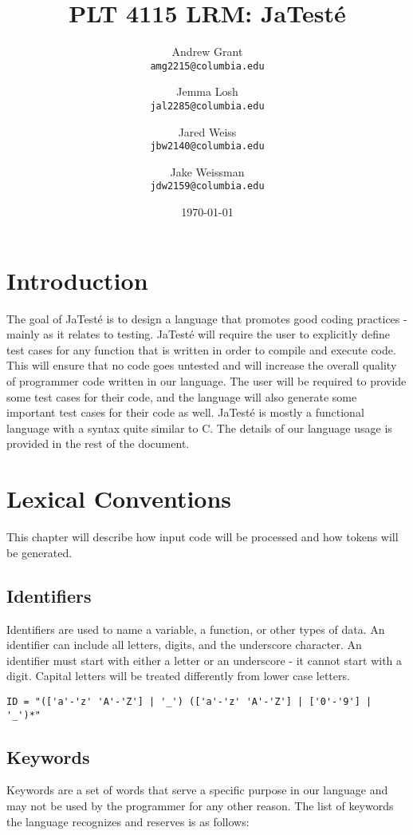 \documentclass{article}
\title{PLT 4115 LRM: \textbf{JaTest\'{e}}}
\author{
	Andrew Grant\\
	\texttt{amg2215@columbia.edu}
	\and
	Jemma Losh\\
	\texttt{jal2285@columbia.edu}
	\and
	Jared Weiss\\
	\texttt{jbw2140@columbia.edu}
	\and
	Jake Weissman\\
	\texttt{jdw2159@columbia.edu}
}
\date{\today}
\begin{document}
\maketitle
\newpage

\tableofcontents
\newpage

\section{Introduction}
The goal of JaTest\'{e} is to design a language that promotes good coding practices - mainly as it relates to testing.  JaTest\'{e} will require the user to explicitly define test cases for any function that is written in order to compile and execute code.  This will ensure that no code goes untested and will increase the overall quality of programmer code written in our language.  The user will be required to provide some test cases for their code, and the language will also generate some important test cases for their code as well.  JaTest\'{e} is mostly a functional language with a syntax quite similar to C.  The details of our language usage is provided in the rest of the document.

\section{Lexical Conventions}
This chapter will describe how input code will be processed and how tokens will be generated.

\subsection{Identifiers}
Identifiers are used to name a variable, a function, or other types of data.  An identifier can include all letters, digits, and the underscore character.  An identifier must start with either a letter or an underscore - it cannot start with a digit.  Capital letters will be treated differently from lower case letters.

\begin{Verbatim}[frame=single]
ID = "(['a'-'z' 'A'-'Z'] | '_') (['a'-'z' 'A'-'Z'] | ['0'-'9'] | '_')*"
\end{Verbatim}


\subsection{Keywords}
Keywords are a set of words that serve a specific purpose in our language and may not be used by the programmer for any other reason.  The list of keywords the language recognizes and reserves is as follows: 
\end{document}
